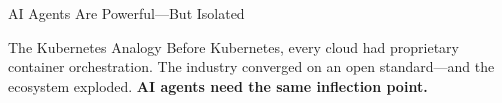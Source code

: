 \begin{frame}{AI Agents Are Powerful---But Isolated}
\begin{center}
  \end{center}

  \begin{exampleblock}{The Kubernetes Analogy}
    \scriptsize
    Before Kubernetes, every cloud had proprietary container orchestration.
    The industry converged on an open standard---and the ecosystem exploded.
    \textbf{AI agents need the same inflection point.}
  \end{exampleblock}
\end{frame}
